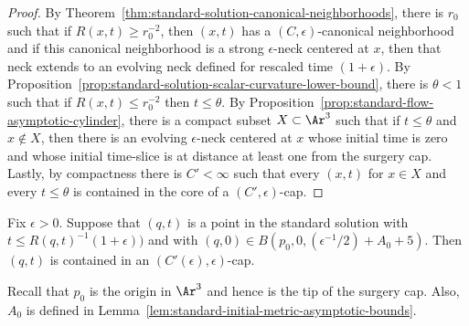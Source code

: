 \begin{proof}
By Theorem~\ref{thm:standard-solution-canonical-neighborhoods}, there is $r_0$ such that if $R(x,t)\ge
r_0^{-2}$, then $(x,t)$ has a  $(C,\epsilon)$-canonical neighborhood
and if this canonical neighborhood is a strong $\epsilon$-neck
centered at $x$, then that neck extends to an evolving neck defined
for rescaled time $(1+\epsilon)$. By Proposition~\ref{prop:standard-solution-scalar-curvature-lower-bound}, there
is $\theta<1$ such that if $R(x,t)\le r_0^{-2}$ then $t\le \theta$.
By Proposition~\ref{prop:standard-flow-asymptotic-cylinder},  there is a compact subset $X\subset \Ar
^3$ such that if $t\le \theta$ and $x\notin X$, then there is an
evolving $\epsilon$-neck centered at $x$ whose initial time is zero
and whose initial time-slice is at distance at least one from the
surgery cap. Lastly, by compactness there is $C'<\infty$ such that
every $(x,t)$ for $x\in X$ and every $t\le \theta$ is contained in
the core of a $(C',\epsilon)$-cap.\end{proof}

\begin{corollary}
\label{cor:standard-solution-cap-near-tip}
\label{stdsolncap}
Fix $\epsilon>0$. Suppose that $(q,t)$ is a point in the standard
solution with $t\le R(q,t)^{-1}(1+\epsilon))$ and with $(q,0)\in
B(p_0,0,(\epsilon^{-1}/2)+A_0+5)$. Then $(q,t)$ is contained in an
$(C'(\epsilon),\epsilon)$-cap.
\end{corollary}

\begin{remark}
\label{rem:tip-and-a0-definitions}
Recall that $p_0$ is the origin in $\Ar^3$ and hence is the tip of
the surgery cap. Also, $A_0$ is defined in Lemma~\ref{lem:standard-initial-metric-asymptotic-bounds}.
\end{remark}


